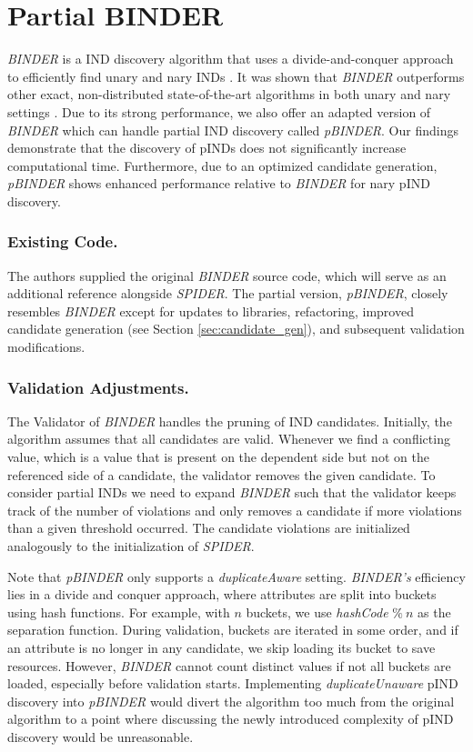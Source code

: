 \section{Partial BINDER}
\textit{BINDER} is a IND discovery algorithm that uses a divide-and-conquer approach to efficiently find unary and nary INDs \cite{papenbrock2015divide}. It was shown that \textit{BINDER} outperforms other exact, non-distributed state-of-the-art algorithms in both unary and nary settings \cite{dursch2019inclusion}. Due to its strong performance, we also offer an adapted version of \textit{BINDER} which can handle partial IND discovery called \textit{pBINDER}. Our findings demonstrate that the discovery of pINDs does not significantly increase computational time. Furthermore, due to an optimized candidate generation, \textit{pBINDER} shows enhanced performance relative to \textit{BINDER} for nary pIND discovery.

\subsubsection{\textbf{Existing Code.}}
The authors supplied the original \textit{BINDER} source code, which will serve as an additional reference alongside \textit{SPIDER}. The partial version, \textit{pBINDER}, closely resembles \textit{BINDER} except for updates to libraries, refactoring, improved candidate generation (see Section \ref{sec:candidate_gen}), and subsequent validation modifications. 

\subsubsection{\textbf{Validation Adjustments.}}
The Validator of \textit{BINDER} handles the pruning of IND candidates. Initially, the algorithm assumes that all candidates are valid. Whenever we find a conflicting value, which is a value that is present on the dependent side but not on the referenced side of a candidate, the validator removes the given candidate. To consider partial INDs we need to expand \textit{BINDER} such that the validator keeps track of the number of violations and only removes a candidate if more violations than a given threshold occurred. The candidate violations are initialized analogously to the initialization of \textit{SPIDER}.

Note that \textit{pBINDER} only supports a \textit{duplicateAware} setting. \linebreak \textit{BINDER's} efficiency lies in a divide and conquer approach, where attributes are split into buckets using hash functions. For example, with $n$ buckets, we use \textit{hashCode} $\% \: n$ as the separation function. During validation, buckets are iterated in some order, and if an attribute is no longer in any candidate, we skip loading its bucket to save resources. However, \textit{BINDER} cannot count distinct values if not all buckets are loaded, especially before validation starts. Implementing \textit{duplicateUnaware} pIND discovery into \textit{pBINDER} would divert the algorithm too much from the original algorithm to a point where discussing the newly introduced complexity of pIND discovery would be unreasonable.